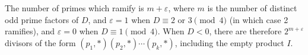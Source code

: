 The number of primes which ramify is $m + \varepsilon$, where $m$ is the number of distinct odd prime factors of $D$, and $\varepsilon = 1$ when $D \equiv 2$ or $3 \pmod{4}$ (in which case 2 ramifies), and $\varepsilon = 0$ when $D \equiv 1 \pmod{4}$. When $D < 0$, there are therefore $2^{m + \varepsilon}$ divisors of the form $(p_1, *)(p_2, *) \cdots (p_k, *)$, including the empty product $I$.
